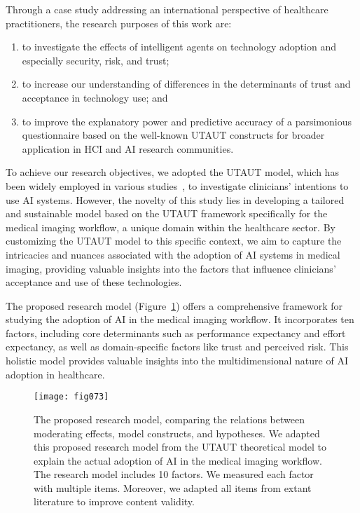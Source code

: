 \vspace{2.00mm}

\noindent
Through a case study addressing an international perspective of healthcare practitioners, the research purposes of this work are:

\vspace{0.05mm}

\begin{enumerate}
\item to investigate the effects of intelligent agents on technology adoption and especially security, risk, and trust;
\item to increase our understanding of differences in the determinants of trust and acceptance in technology use; and
\item to improve the explanatory power and predictive accuracy of a parsimonious questionnaire based on the well-known \ac{UTAUT} constructs for broader application in \ac{HCI} and \ac{AI} research communities.
\end{enumerate}

\vspace{0.05mm}

To achieve our research objectives, we adopted the \ac{UTAUT} model, which has been widely employed in various studies~\cite{BOOTSMAN201999}, to investigate clinicians' intentions to use \ac{AI} systems.
However, the novelty of this study lies in developing a tailored and sustainable model based on the \ac{UTAUT} framework specifically for the medical imaging workflow, a unique domain within the healthcare sector.
By customizing the \ac{UTAUT} model to this specific context, we aim to capture the intricacies and nuances associated with the adoption of \ac{AI} systems in medical imaging, providing valuable insights into the factors that influence clinicians' acceptance and use of these technologies.

The proposed research model (Figure~\ref{fig:fig073}) offers a comprehensive framework for studying the adoption of \ac{AI} in the medical imaging workflow.
It incorporates ten factors, including core determinants such as performance expectancy and effort expectancy, as well as domain-specific factors like trust and perceived risk.
This holistic model provides valuable insights into the multidimensional nature of \ac{AI} adoption in healthcare.

\begin{figure}[htbp]
\centering
\texttt{[image: fig073]}
\caption{The proposed research model, comparing the relations between moderating effects, model constructs, and hypotheses. We adapted this proposed research model from the UTAUT theoretical model to explain the actual adoption of AI in the medical imaging workflow. The research model includes 10 factors. We measured each factor with multiple items. Moreover, we adapted all items from extant literature to improve content validity.}
\label{fig:fig073}
\end{figure}

